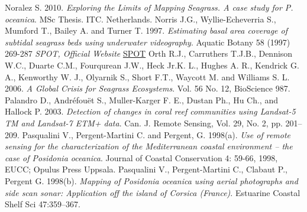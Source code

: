 \documentclass[11pt]{article}
\begin{document}
\begin{thebibliography}{999}
Noralez S. 2010. \emph{Exploring the Limits of Mapping Seagrass. A case study for P. oceanica}. MSc Thesis. ITC. Netherlands. \pageref{Noralez10}
Norris J.G., Wyllie-Echeverria S., Mumford T., Bailey A. and Turner T. 1997. \emph{Estimating basal area coverage of subtidal seagrass beds using underwater videography}.
Aquatic Botany 58 (1997) 269-287 \pageref{Noralez10}
\emph{SPOT, Official Website} \href{http://www.spotimage.com/web/en/172-spot-images.php}{SPOT} \pageref{SPOT}
Orth R.J., Carruthers T.J.B., Dennison W.C., Duarte C.M., Fourqurean J.W., Heck Jr.K. L., Hughes A. R., Kendrick G. A., Kenworthy W. J., Olyarnik S., Short F.T., Waycott M. and Williams S. L. 2006. \emph{A Global Crisis for Seagrass Ecosystems}. Vol. 56 No. 12, BioScience 987. \pageref{Orth06}
Palandro D., Andr\'efou\"et S., Muller-Karger F. E., Dustan Ph., Hu Ch., and Hallock P. 2003. \emph{Detection of changes in coral reef communities using Landsat-5 TM and Landsat-7 ETM+ data}. Can. J. Remote Sensing, Vol. 29, No. 2, pp. 201–209. \pageref{Palandro03}
Pasqualini V., Pergent-Martini C. and Pergent, G. 1998(a). \emph{Use of remote sensing for the characterization of the Mediterranean coastal environment – the case of Posidonia
oceanica}. Journal of Coastal Conservation 4: 59-66, 1998, EUCC; Opulus Press Uppsala. \pageref{Pasqualini98a}
Pasqualini V., Pergent-Martini C., Clabaut P., Pergent G. 1998(b). \emph{Mapping of \textit{{Posidonia oceanica}} using aerial photographs and side scan sonar: Application off the
island of Corsica (France)}. Estuarine Coastal Shelf Sci 47:359–367. \pageref{Pasqualini98b}

\end{thebibliography}
\end{document}
